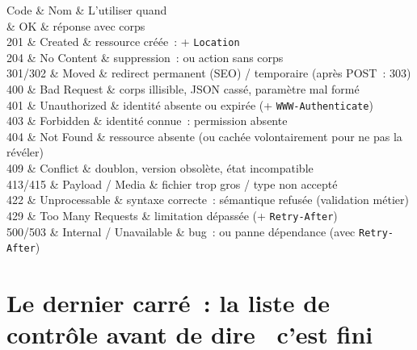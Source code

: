 \begin{tablez}
  \headrow Code \& Nom \& L'utiliser quand \\
   \& OK \& r\'eponse avec corps \\
  201 \& Created \& ressource cr\'e\'ee~: + \verb|Location| \\
  204 \& No Content \& suppression~: ou action sans corps \\
  301/302 \& Moved \& redirect permanent (SEO) / temporaire (apr\`es POST~: 303) \\
  400 \& Bad Request \& corps illisible, JSON cass\'e, param\`etre mal form\'e \\
  401 \& Unauthorized \& identit\'e absente ou expir\'ee (+ \verb|WWW-Authenticate|) \\
  403 \& Forbidden \& identit\'e connue~: permission absente \\
  404 \& Not Found \& ressource absente (ou cach\'ee volontairement pour ne pas la r\'ev\'eler) \\
  409 \& Conflict \& doublon, version obsol\`ete, \'etat incompatible \\
  413/415 \& Payload / Media \& fichier trop gros / type non accept\'e \\
  422 \& Unprocessable \& syntaxe correcte~: s\'emantique refus\'ee (validation m\'etier) \\
  429 \& Too Many Requests \& limitation d\'epass\'ee (+ \verb|Retry-After|) \\
  500/503 \& Internal / Unavailable \& bug~: ou panne d\'ependance (avec \verb|Retry-After|) \\
\end{tablez}

\section{Le dernier carr\'e~: la liste de contr\^ole avant de dire \og ~c'est fini~ \fg{}}

